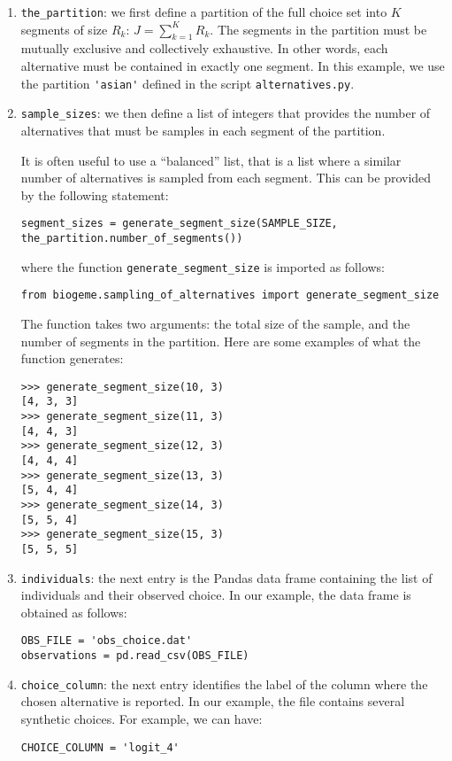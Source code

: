 \documentclass[12pt,a4paper]{article}
\begin{document}
\begin{enumerate}
  \item \lstinline+the_partition+: we first define a partition of the full choice set into $K$ segments
of size $R_k$: $J=\sum_{k=1}^K R_k$. The segments in the partition
must be mutually exclusive and collectively exhaustive. In other
words, each alternative must be contained in exactly one segment.
In this example, we use the partition \lstinline+'asian'+ defined in the script \lstinline+alternatives.py+. 

  \item \lstinline+sample_sizes+: we then define a list of integers that provides the number of
alternatives that must be samples in each segment of the partition.

It is often useful to use a ``balanced'' list, that is a list where a similar number of alternatives is sampled from each segment. This can be provided by the following statement:
\begin{lstlisting}
segment_sizes = generate_segment_size(SAMPLE_SIZE, the_partition.number_of_segments())
\end{lstlisting}
where the function \lstinline+generate_segment_size+ is imported as follows:
\begin{lstlisting}
from biogeme.sampling_of_alternatives import generate_segment_size
\end{lstlisting}
The function takes two arguments: the total size of the sample, and the number of segments in the partition. Here are some examples of what the function generates:
\begin{lstlisting}
>>> generate_segment_size(10, 3)
[4, 3, 3]
>>> generate_segment_size(11, 3)
[4, 4, 3]
>>> generate_segment_size(12, 3)
[4, 4, 4]
>>> generate_segment_size(13, 3)
[5, 4, 4]
>>> generate_segment_size(14, 3)
[5, 5, 4]
>>> generate_segment_size(15, 3)
[5, 5, 5]
\end{lstlisting}

\item \lstinline+individuals+: the next entry is the Pandas data frame
  containing the list of individuals and their observed choice. In our
  example, the data frame is obtained as follows:
  \begin{lstlisting}
OBS_FILE = 'obs_choice.dat'
observations = pd.read_csv(OBS_FILE)
  \end{lstlisting}
\item \lstinline+choice_column+: the next entry identifies the label of the column where the chosen alternative is reported. In our example, the file contains several synthetic choices. For example, we can have:
  \begin{lstlisting}
CHOICE_COLUMN = 'logit_4'
  \end{lstlisting}


\end{enumerate}
\end{document}

